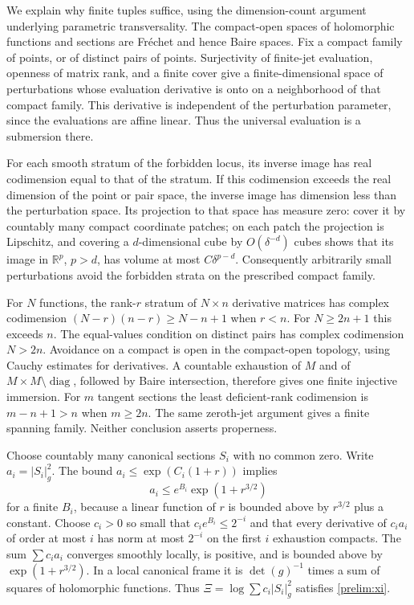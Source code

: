 \documentclass[11pt]{article}
\theoremstyle{definition}
\theoremstyle{remark}
\newcommand{\R}{\mathbb R}
\numberwithin{equation}{section}
\begin{document}
We explain why finite tuples suffice, using the dimension-count
argument underlying parametric transversality.
The compact-open spaces of holomorphic functions and sections are
Fr\'echet and hence Baire spaces. Fix a compact family of points,
or of distinct pairs of points. Surjectivity of finite-jet evaluation,
openness of matrix rank, and a finite cover give a finite-dimensional
space of perturbations whose evaluation derivative is onto on a
neighborhood of that compact family. This derivative is independent
of the perturbation parameter, since the evaluations are affine
linear. Thus the universal evaluation is a submersion there.

For each smooth stratum of the forbidden locus, its inverse image
has real codimension equal to that of the stratum. If this codimension
exceeds the real dimension of the point or pair space, the inverse
image has dimension less than the perturbation space. Its projection
to that space has measure zero: cover it by countably many compact
coordinate patches; on each patch the projection is Lipschitz, and
covering a $d$-dimensional cube by $O(\delta^{-d})$ cubes shows that
its image in $\R^p$, $p>d$, has volume at most $C\delta^{p-d}$.
Consequently arbitrarily small perturbations avoid the forbidden
strata on the prescribed compact family.

For $N$ functions, the rank-$r$ stratum of $N\times n$ derivative
matrices has complex codimension $(N-r)(n-r)\ge N-n+1$ when $r<n$.
For $N\ge2n+1$ this exceeds $n$.
The equal-values condition on distinct pairs has complex codimension
$N>2n$. Avoidance on a compact is open in the compact-open topology,
using Cauchy estimates for derivatives. A countable exhaustion of
$M$ and of $M\times M\setminus\operatorname{diag}$, followed by Baire
intersection, therefore gives one finite injective immersion.
For $m$ tangent sections the least deficient-rank codimension is
$m-n+1>n$ when $m\ge2n$. The same zeroth-jet argument gives a finite
spanning family. Neither conclusion asserts properness.

Choose countably many canonical sections $S_i$ with no common zero.
Write $a_i=|S_i|_g^2$.  The bound
$a_i\le\exp(C_i(1+r))$ implies
\[
 a_i\le e^{B_i}\exp(1+r^{3/2})
\]
for a finite $B_i$, because a linear function of $r$ is bounded above
by $r^{3/2}$ plus a constant.  Choose $c_i>0$ so small that
$c_ie^{B_i}\le2^{-i}$ and that every derivative of $c_i a_i$ of order
at most $i$ has norm at most $2^{-i}$ on the first $i$ exhaustion
compacts.  The sum $\sum c_i a_i$ converges smoothly locally, is
positive, and is bounded above by $\exp(1+r^{3/2})$.  In a local
canonical frame it is $\det(g)^{-1}$ times a sum of squares of
holomorphic functions.  Thus
$\Xi=\log\sum c_i|S_i|_g^2$ satisfies \eqref{prelim:xi}.
\end{document}
